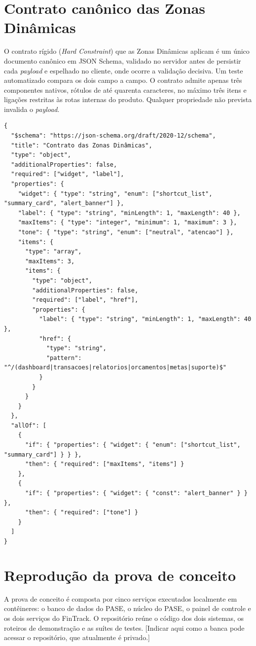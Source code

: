 \begin{apendicesenv}
\chapter[Contrato canônico das Zonas Dinâmicas]{Contrato canônico das Zonas Dinâmicas}
O contrato rígido (\textit{Hard Constraint}) que as Zonas Dinâmicas aplicam é um único documento canônico em JSON Schema, validado no servidor antes de persistir cada \textit{payload} e espelhado no cliente, onde ocorre a validação decisiva. Um teste automatizado compara os dois campo a campo. O contrato admite apenas três componentes nativos, rótulos de até quarenta caracteres, no máximo três itens e ligações restritas às rotas internas do produto. Qualquer propriedade não prevista invalida o \textit{payload}.

{\scriptsize
\begin{verbatim}
{
  "$schema": "https://json-schema.org/draft/2020-12/schema",
  "title": "Contrato das Zonas Dinâmicas",
  "type": "object",
  "additionalProperties": false,
  "required": ["widget", "label"],
  "properties": {
    "widget": { "type": "string", "enum": ["shortcut_list", "summary_card", "alert_banner"] },
    "label": { "type": "string", "minLength": 1, "maxLength": 40 },
    "maxItems": { "type": "integer", "minimum": 1, "maximum": 3 },
    "tone": { "type": "string", "enum": ["neutral", "atencao"] },
    "items": {
      "type": "array",
      "maxItems": 3,
      "items": {
        "type": "object",
        "additionalProperties": false,
        "required": ["label", "href"],
        "properties": {
          "label": { "type": "string", "minLength": 1, "maxLength": 40 },
          "href": {
            "type": "string",
            "pattern": "^/(dashboard|transacoes|relatorios|orcamentos|metas|suporte)$"
          }
        }
      }
    }
  },
  "allOf": [
    {
      "if": { "properties": { "widget": { "enum": ["shortcut_list", "summary_card"] } } },
      "then": { "required": ["maxItems", "items"] }
    },
    {
      "if": { "properties": { "widget": { "const": "alert_banner" } } },
      "then": { "required": ["tone"] }
    }
  ]
}
\end{verbatim}
}

\chapter[Reprodução da prova de conceito]{Reprodução da prova de conceito}
A prova de conceito é composta por cinco serviços executados localmente em contêineres: o banco de dados do PASE, o núcleo do PASE, o painel de controle e os dois serviços do FinTrack. O repositório reúne o código dos dois sistemas, os roteiros de demonstração e as suítes de testes. [Indicar aqui como a banca pode acessar o repositório, que atualmente é privado.]


\end{apendicesenv}
